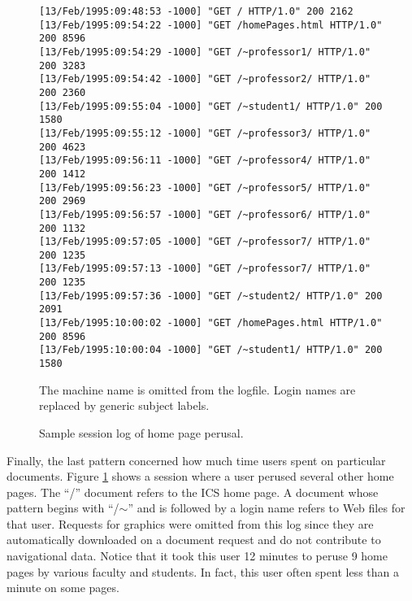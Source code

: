 \begin{figure}[htbp]
\begin{center}
\begin{verbatim}
[13/Feb/1995:09:48:53 -1000] "GET / HTTP/1.0" 200 2162
[13/Feb/1995:09:54:22 -1000] "GET /homePages.html HTTP/1.0" 200 8596
[13/Feb/1995:09:54:29 -1000] "GET /~professor1/ HTTP/1.0" 200 3283
[13/Feb/1995:09:54:42 -1000] "GET /~professor2/ HTTP/1.0" 200 2360
[13/Feb/1995:09:55:04 -1000] "GET /~student1/ HTTP/1.0" 200 1580
[13/Feb/1995:09:55:12 -1000] "GET /~professor3/ HTTP/1.0" 200 4623
[13/Feb/1995:09:56:11 -1000] "GET /~professor4/ HTTP/1.0" 200 1412
[13/Feb/1995:09:56:23 -1000] "GET /~professor5/ HTTP/1.0" 200 2969
[13/Feb/1995:09:56:57 -1000] "GET /~professor6/ HTTP/1.0" 200 1132
[13/Feb/1995:09:57:05 -1000] "GET /~professor7/ HTTP/1.0" 200 1235
[13/Feb/1995:09:57:13 -1000] "GET /~professor7/ HTTP/1.0" 200 1235
[13/Feb/1995:09:57:36 -1000] "GET /~student2/ HTTP/1.0" 200 2091
[13/Feb/1995:10:00:02 -1000] "GET /homePages.html HTTP/1.0" 200 8596
[13/Feb/1995:10:00:04 -1000] "GET /~student1/ HTTP/1.0" 200 1580
\end{verbatim}
\end{center}
The machine name is omitted from the logfile.  Login names are replaced by
generic subject labels.
\caption{Sample session log of home page perusal.}
\label{fig:loghp}
\end{figure}

Finally, the last pattern concerned how much time users spent on particular
documents.  Figure \ref{fig:loghp} shows a session where a user perused several
other home pages.  The ``/'' document refers to the ICS home page.  A document
whose pattern begins with ``/$\sim$'' and is followed by a login name refers to
Web files for that user.  Requests for graphics were omitted from this log
since they are automatically downloaded on a document request and do not
contribute to navigational data.  Notice that it took this user 12 minutes to
peruse 9 home pages by various faculty and students.  In fact, this user often
spent less than a minute on some pages.

